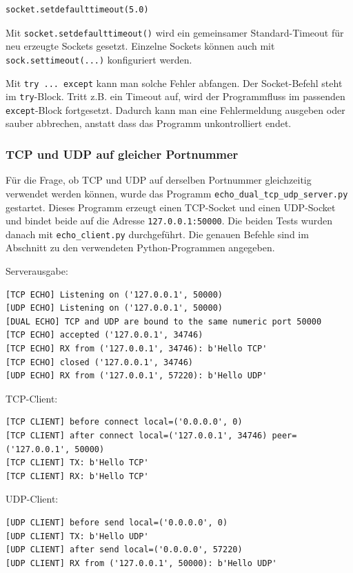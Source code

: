 \documentclass{kdiartcl}
\begin{document}
\begin{verbatim}
socket.setdefaulttimeout(5.0)
\end{verbatim}

Mit \texttt{socket.setdefaulttimeout()} wird ein gemeinsamer Standard-Timeout für neu erzeugte Sockets gesetzt. Einzelne Sockets können auch mit \texttt{sock.settimeout(...)} konfiguriert werden.

Mit \texttt{try ... except} kann man solche Fehler abfangen. Der Socket-Befehl steht im \texttt{try}-Block. Tritt z.B. ein Timeout auf, wird der Programmfluss im passenden \texttt{except}-Block fortgesetzt. Dadurch kann man eine Fehlermeldung ausgeben oder sauber abbrechen, anstatt dass das Programm unkontrolliert endet.

\subsubsection{TCP und UDP auf gleicher Portnummer}

Für die Frage, ob TCP und UDP auf derselben Portnummer gleichzeitig verwendet werden können, wurde das Programm \texttt{echo\_dual\_tcp\_udp\_server.py} gestartet. Dieses Programm erzeugt einen TCP-Socket und einen UDP-Socket und bindet beide auf die Adresse \texttt{127.0.0.1:50000}. Die beiden Tests wurden danach mit \texttt{echo\_client.py} durchgeführt. Die genauen Befehle sind im Abschnitt zu den verwendeten Python-Programmen angegeben.

Serverausgabe:

\begin{verbatim}
[TCP ECHO] Listening on ('127.0.0.1', 50000)
[UDP ECHO] Listening on ('127.0.0.1', 50000)
[DUAL ECHO] TCP and UDP are bound to the same numeric port 50000
[TCP ECHO] accepted ('127.0.0.1', 34746)
[TCP ECHO] RX from ('127.0.0.1', 34746): b'Hello TCP'
[TCP ECHO] closed ('127.0.0.1', 34746)
[UDP ECHO] RX from ('127.0.0.1', 57220): b'Hello UDP'
\end{verbatim}

TCP-Client:

\begin{verbatim}
[TCP CLIENT] before connect local=('0.0.0.0', 0)
[TCP CLIENT] after connect local=('127.0.0.1', 34746) peer=('127.0.0.1', 50000)
[TCP CLIENT] TX: b'Hello TCP'
[TCP CLIENT] RX: b'Hello TCP'
\end{verbatim}

UDP-Client:

\begin{verbatim}
[UDP CLIENT] before send local=('0.0.0.0', 0)
[UDP CLIENT] TX: b'Hello UDP'
[UDP CLIENT] after send local=('0.0.0.0', 57220)
[UDP CLIENT] RX from ('127.0.0.1', 50000): b'Hello UDP'
\end{verbatim}
\end{document}
